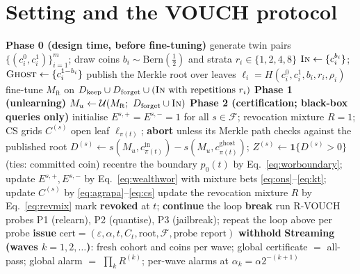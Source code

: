 \documentclass[pdflatex,sn-mathphys-num]{sn-jnl}
\theoremstyle{thmstyleone}
\theoremstyle{thmstyletwo}
\theoremstyle{thmstylethree}
\newcommand{\F}{\mathcal{F}}
\newcommand{\Ucal}{\mathcal{U}}
\newcommand{\Bern}{\mathrm{Bern}}
\newcommand{\eps}{\varepsilon}
\begin{document}
\section{Setting and the VOUCH protocol}\label{sec:framework}


\begin{algorithm}[t]
\caption{The VOUCH protocol}\label{alg:vouch}
\begin{algorithmic}[1]
\Statex \textbf{Phase 0 (design time, before fine-tuning)}
\State generate twin pairs $\{(c_i^0, c_i^1)\}_{i=1}^m$; draw coins
       $b_i \sim \Bern(\tfrac12)$ and strata $r_i \in \{1,2,4,8\}$
\State $\textsc{In} \gets \{c_i^{b_i}\}$;\quad $\textsc{Ghost} \gets \{c_i^{1-b_i}\}$
\State publish the Merkle root over leaves
       $\ell_i = H(c_i^0, c_i^1, b_i, r_i, \rho_i)$
\State fine-tune $M_{\mathrm{ft}}$ on $D_{\text{keep}} \cup D_{\text{forget}} \cup
       (\textsc{In} \text{ with repetitions } r_i)$
\Statex \textbf{Phase 1 (unlearning)}
\State $M_u \gets \Ucal(M_{\mathrm{ft}};\ D_{\text{forget}} \cup \textsc{In})$
\Statex \textbf{Phase 2 (certification; black-box queries only)}
\State initialise $E^{s,+} = E^{s,-} = 1$ for all $s \in \F$; revocation mixture
       $R = 1$; CS grids $C^{(s)}$
  \State open leaf $\ell_{\pi(t)}$; \textbf{abort} unless its Merkle path checks
         against the published root
  \For{$s \in \F$}
     \State $D^{(s)} \gets s(M_u, c^{\text{in}}_{\pi(t)}) -
            s(M_u, c^{\text{ghost}}_{\pi(t)})$;\quad
            $Z^{(s)} \gets \mathbf{1}\{D^{(s)} > 0\}$ (ties: committed coin)
     \State recentre the boundary $p_0(t)$ by Eq.~\eqref{eq:worboundary}; update
            $E^{s,+}, E^{s,-}$ by Eq.~\eqref{eq:wealthwor} with mixture bets
            \eqref{eq:ons}--\eqref{eq:kt}; update $C^{(s)}$ by
            \eqref{eq:agrapa}--\eqref{eq:cs}
  \EndFor
  \State update the revocation mixture $R$ by Eq.~\eqref{eq:revmix}
     \State mark \textbf{revoked} at $t$; \textbf{continue} the loop
  \EndIf
     \State \textbf{break} 
  \EndIf
\EndFor
\State run R-VOUCH probes P1 (relearn), P2 (quantise), P3 (jailbreak); repeat the
       loop above per probe
   \State \textbf{issue} $\mathrm{cert} = (\eps, \alpha, t, C_t, \mathrm{root},
          \F, \text{probe report})$
\Else
   \State \textbf{withhold} 
\EndIf
\Statex \textbf{Streaming (waves $k = 1, 2, \dots$)}: fresh cohort and coins per wave;
        global certificate $=$ all-pass; global alarm $=$ $\prod_k R^{(k)}$; per-wave
        alarms at $\alpha_k = \alpha 2^{-(k+1)}$ 
\end{algorithmic}
\end{algorithm}
\end{document}

